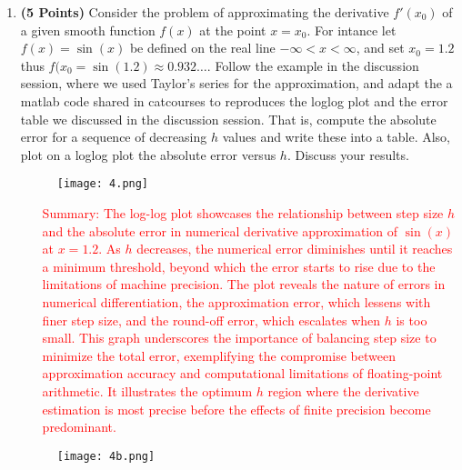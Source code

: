 \documentclass[11pt]{article}
\begin{document}
\begin{enumerate}
 \item {\bf (5 Points)} Consider the problem of approximating the
   derivative $f'(x_0)$ of a given smooth function $f(x)$ at the point
   $x=x_0$. For intance let $f(x) = \sin(x)$ be defined on the real
   line $-\infty < x < \infty$, and set $x_0 = 1.2$ thus $f(x_0 =
   \sin(1.2) \approx 0.932\dots$. Follow the example in the discussion
   session, where we used Taylor's series for the approximation, and
   adapt the a matlab code shared in catcourses to reproduces the
   loglog plot and the error table we discussed in the discussion
   session. That is, compute the absolute error for a sequence of
   decreasing $h$ values and write these into a table. Also, plot on a
   loglog plot the absolute error versus $h$. Discuss your results.


    \begin{figure}[H]
    \centering
    \texttt{[image: 4.png]} 
    \end{figure}


\begin{enumerate}
    \item[\textcolor{red}{Summary:}] 
    \textcolor{red}{
      The log-log plot showcases the relationship between step size \( h \) and the absolute error in numerical derivative approximation of \( \sin(x) \) at \( x = 1.2 \). As \( h \) decreases, the numerical error diminishes until it reaches a minimum threshold, beyond which the error starts to rise due to the limitations of machine precision. The plot reveals the nature of errors in numerical differentiation, the approximation error, which lessens with finer step size, and the round-off error, which escalates when \( h \) is too small. This graph underscores the importance of balancing step size to minimize the total error, exemplifying the compromise between approximation accuracy and computational limitations of floating-point arithmetic. It illustrates the optimum \( h \) region where the derivative estimation is most precise before the effects of finite precision become predominant.}
\end{enumerate}

    \begin{figure}[H]
    \centering
    \texttt{[image: 4b.png]} 
    \end{figure}



\end{enumerate}
\end{document}
